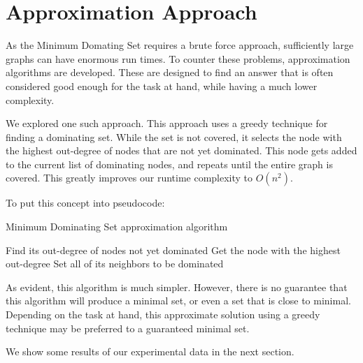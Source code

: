 \documentclass[paper.tex]{subfiles}
\begin{document}
\section{Approximation Approach}

As the Minimum Domating Set requires a brute force approach, sufficiently large graphs can have enormous run times.
To counter these problems, approximation algorithms are developed.
These are designed to find an answer that is often considered good enough for the task at hand, while having a much lower complexity.

We explored one such approach.
This approach uses a greedy technique for finding a dominating set.
While the set is not covered, it selects the node with the highest out-degree of nodes that are not yet dominated.
This node gets added to the current list of dominating nodes, and repeats until the entire graph is covered.
This greatly improves our runtime complexity to $O(n^2)$.

To put this concept into pseudocode:

\begin{algorithm}[H]

    \caption{Minimum Dominating Set approximation algorithm}

    \begin{algorithmic}[1]
                    \State Find its out-degree of nodes not yet dominated
                \EndFor
                \State Get the node with the highest out-degree
                \State Set all of its neighbors to be dominated
            \EndWhile
        \EndProcedure
    \end{algorithmic}

\end{algorithm}

As evident, this algorithm is much simpler.
However, there is no guarantee that this algorithm will produce a minimal set, or even a set that is close to minimal.
Depending on the task at hand, this approximate solution using a greedy technique may be preferred to a guaranteed minimal set.

We show some results of our experimental data in the next section.
\end{document}
